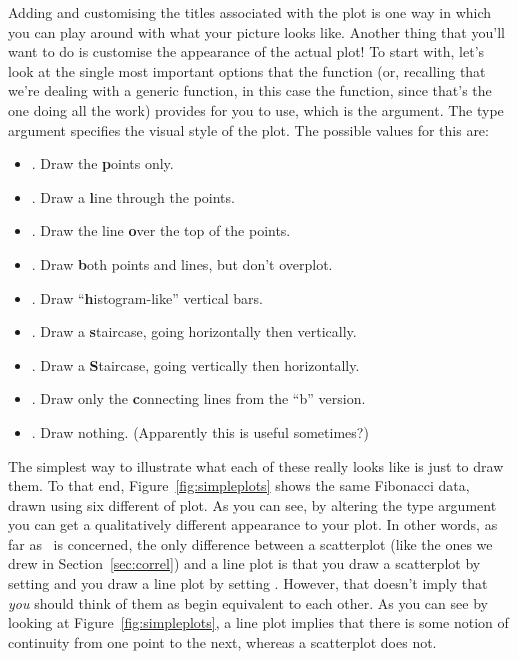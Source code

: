 Adding and customising the titles associated with the plot is one way in which you can play around with what your picture looks like. Another thing that you'll want to do is customise the appearance of the actual plot! To start with, let's look at the single most important options that the  function (or, recalling that we're dealing with a generic function, in this case the  function, since that's the one doing all the work) provides for you to use, which is the  argument. The type argument specifies the visual style of the plot. The possible values for this are:
\begin{itemize} \itemsep 0pt
\item {}. Draw the {\bf p}oints only.
\item {}. Draw a {\bf l}ine through the points.
\item {}. Draw the line {\bf o}ver the top of the points.
\item {}. Draw {\bf b}oth points and lines, but don't overplot.
\item {}. Draw ``{\bf h}istogram-like'' vertical bars.
\item {}. Draw a {\bf s}taircase, going horizontally then vertically.
\item {}. Draw a {\bf S}taircase, going vertically then horizontally.
\item {}. Draw only the {\bf c}onnecting lines from the ``b'' version.
\item {}. Draw nothing. (Apparently this is useful sometimes?)
\end{itemize}
The simplest way to illustrate what each of these really looks like is just to draw them. To that end, Figure~\ref{fig:simpleplots} shows the same Fibonacci data, drawn using six different  of plot. As you can see, by altering the type argument you can get a qualitatively different appearance to your plot. In other words, as far as \R\ is concerned, the only difference between a scatterplot (like the ones we drew in Section~\ref{sec:correl})  and a line plot is that you draw a scatterplot by setting  and you draw a line plot by setting . However, that doesn't imply that {\it you} should think of them as begin equivalent to each other. As you can see by looking at Figure~\ref{fig:simpleplots}, a line plot implies that there is some notion of continuity from one point to the next, whereas a scatterplot does not.



